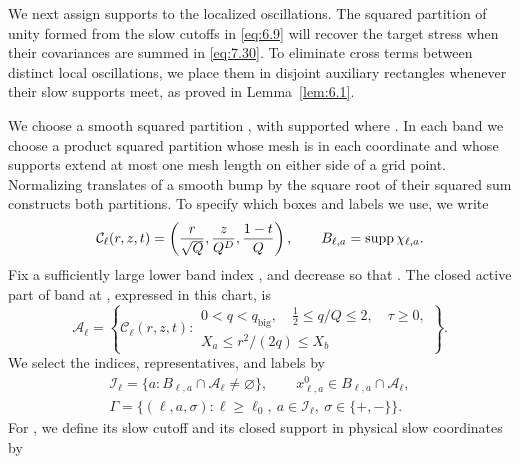 We next assign supports to the localized oscillations. The squared partition of unity formed from the slow cutoffs in \eqref{eq:6.9} will recover the target stress when their covariances are summed in \eqref{eq:7.30}. To eliminate cross terms between distinct local oscillations, we place them in disjoint auxiliary rectangles whenever their slow supports meet, as proved in Lemma~\ref{lem:6.1}.

We choose a smooth squared partition , with  supported where . In each band we choose a product squared partition  whose mesh is  in each coordinate and whose supports extend at most one mesh length on either side of a grid point. Normalizing translates of a smooth bump by the square root of their squared sum constructs both partitions. To specify which boxes and labels we use, we write
\[
 \mathcal C_\ell(r,z,t)=\left(\frac r{\sqrt Q},\frac z{Q^D},\frac{1-t}{Q}\right),
 \qquad
 B_{\ell,a}=\operatorname{supp}\chi_{\ell,a}.
\]
Fix a sufficiently large lower band index , and decrease  so that . The closed active part of band  at , expressed in this chart, is
\[
 \mathcal A_\ell=
 \left\{\mathcal C_\ell(r,z,t):
 \begin{array}{c}
 0<q<q_{\mathrm{big}},\quad \frac12\le q/Q\le2,\quad \tau\ge0,\\[2pt]
 X_a\le r^2/(2q)\le X_b
 \end{array}
 \right\}.
\]
We select the indices, representatives, and labels by
\begin{equation}
\begin{gathered}
 \mathcal I_\ell=\{a:B_{\ell,a}\cap\mathcal A_\ell\ne\varnothing\},
 \qquad x^0_{\ell,a}\in B_{\ell,a}\cap\mathcal A_\ell,\\
 \Gamma=\{(\ell,a,\sigma):\ell\ge\ell_0,\ a\in\mathcal I_\ell,\ \sigma\in\{+,-\}\}.
\end{gathered}
 \tag{6.8}\label{eq:6.8}
\end{equation}
%
For , we define its slow cutoff and its closed support in physical slow coordinates by
